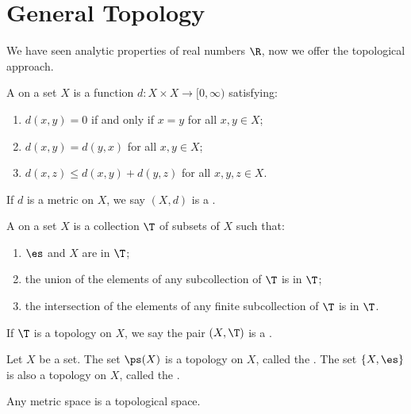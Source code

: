 \documentclass[10pt]{article}
\begin{document}
\section{General Topology}
We have seen analytic properties of real numbers $\R$, now we offer the topological approach.
\begin{definition}
    A  on a set $X$ is a function $d:X\times X\to[0,\infty)$ satisfying:
    \begin{enumerate}
        \item $d(x,y)=0$ if and only if $x=y$ for all $x,y\in X$;
        \item $d(x,y)=d(y,x)$ for all $x,y\in X$;
        \item $d(x,z)\le d(x,y)+d(y,z)$ for all $x,y,z\in X$.
    \end{enumerate}
    If $d$ is a metric on $X$, we say $(X,d)$ is a .
\end{definition}
\begin{definition}
    
\end{definition}
\begin{definition}
    A  on a set $X$ is a collection $\T$ of subsets of $X$ such that:
    \begin{enumerate}
        \item $\es$ and $X$ are in $\T$;
        \item the union of the elements of any subcollection of $\T$ is in $\T$;
        \item the intersection of the elements of any finite subcollection of $\T$ is in $\T$.
    \end{enumerate}
    If $\T$ is a topology on $X$, we say the pair $(X,\T)$ is a .
\end{definition}
\begin{example}
    Let $X$ be a set. The set $\ps(X)$ is a topology on $X$, called the . The set $\{X,\es\}$ is also a topology on $X$, called the .
\end{example}
\begin{proposition}
    Any metric space is a topological space.
\end{proposition}
\end{document}
